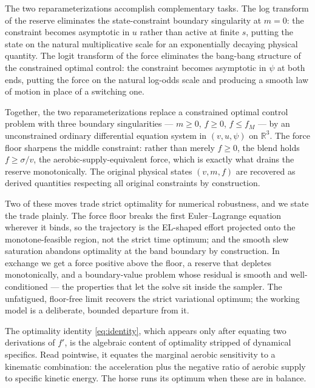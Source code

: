 \documentclass[11pt]{article}
\begin{document}
The two reparameterizations accomplish complementary tasks. The log transform of the reserve eliminates the state-constraint boundary singularity at $m = 0$: the constraint becomes asymptotic in $u$ rather than active at finite $s$, putting the state on the natural multiplicative scale for an exponentially decaying physical quantity. The logit transform of the force eliminates the bang-bang structure of the constrained optimal control: the constraint becomes asymptotic in $\psi$ at both ends, putting the force on the natural log-odds scale and producing a smooth law of motion in place of a switching one.

Together, the two reparameterizations replace a constrained optimal control problem with three boundary singularities --- $m \geq 0$, $f \geq 0$, $f \leq f_M$ --- by an unconstrained ordinary differential equation system in $(v, u, \psi)$ on $\mathbb{R}^3$. The force floor sharpens the middle constraint: rather than merely $f \geq 0$, the blend holds $f \geq \sigma/v$, the aerobic-supply-equivalent force, which is exactly what drains the reserve monotonically. The original physical states $(v, m, f)$ are recovered as derived quantities respecting all original constraints by construction.

Two of these moves trade strict optimality for numerical robustness, and we state the trade plainly. The force floor breaks the first Euler--Lagrange equation wherever it binds, so the trajectory is the EL-shaped effort projected onto the monotone-feasible region, not the strict time optimum; and the smooth slew saturation abandons optimality at the band boundary by construction. In exchange we get a force positive above the floor, a reserve that depletes monotonically, and a boundary-value problem whose residual is smooth and well-conditioned --- the properties that let the solve sit inside the sampler. The unfatigued, floor-free limit recovers the strict variational optimum; the working model is a deliberate, bounded departure from it.

The optimality identity \eqref{eq:identity}, which appears only after equating two derivations of $f'$, is the algebraic content of optimality stripped of dynamical specifics. Read pointwise, it equates the marginal aerobic sensitivity to a kinematic combination: the acceleration plus the negative ratio of aerobic supply to specific kinetic energy. The horse runs its optimum when these are in balance.
\end{document}
